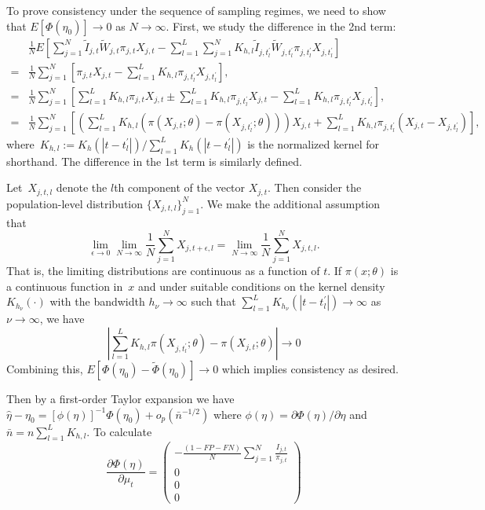 \documentclass[12pt]{amsart}
\numberwithin{equation}{section}
\theoremstyle{plain}
\begin{document}
To prove consistency under the sequence of sampling regimes, we need to show that $E[ \Phi (\eta_0) ] \to 0$ as $N \to \infty$.  First, we study the difference in the 2nd term:
\begin{align*}
&\frac{1}{N}  E \left[ \sum_{j = 1}^N \tilde I_{j,t} \tilde W_{j,t}  \pi_{j,t} X_{j,t} - \sum_{l=1}^L  \sum_{j = 1}^N K_{h,l} \tilde I_{j,t^\prime_l} \tilde W_{j,t^\prime_l}  \pi_{j,t^\prime_l} X_{j,t^\prime_l} \right] \\
= &\frac{1}{N} \sum_{j = 1}^N \left[ \pi_{j,t} X_{j,t} - \sum_{l=1}^L K_{h,l} \pi_{j,t^\prime_l} X_{j,t^\prime_l} \right], \\
= &\frac{1}{N} \sum_{j = 1}^N \left[ \sum_{l=1}^L K_{h,l} \pi_{j,t} X_{j,t} \pm \sum_{l=1}^L K_{h,l} \pi_{j,t_l^\prime} X_{j,t}  - \sum_{l=1}^L K_{h, l} \pi_{j,t^\prime_l} X_{j,t^\prime_l} \right], \\
= &\frac{1}{N} \sum_{j = 1}^N \left[ \left( \sum_{l=1}^L K_{h,l}  \left( \pi (X_{j,t}; \theta) - \pi (X_{j,t^\prime_l}; \theta) \right) \right) X_{j,t} + \sum_{l=1}^L K_{h,l} \pi_{j,t^\prime_l} (X_{j,t} - X_{j,t^\prime_l} ) \right],
\end{align*}
where~$K_{h,l} := K_h(|t - t_l^\prime|) / \sum_{l=1}^L K_{h} \left(|t - t_l^\prime| \right)$ is the normalized kernel for shorthand. The difference in the 1st term is similarly defined.

Let~$X_{j,t,l}$ denote the $l$th component of the vector $X_{j,t}$.  Then consider the population-level distribution $\{ X_{j,t,l} \}_{j=1}^N$.  We make the additional assumption that
$$
\lim_{\epsilon \to 0} \lim_{N \to \infty} \frac{1}{N} \sum_{j=1}^N X_{j,t+\epsilon, l}  = \lim_{N \to \infty} \frac{1}{N} \sum_{j=1}^N X_{j,t, l}.
$$
That is, the limiting distributions are continuous as a function of $t$. If $\pi(x; \theta)$ is a continuous function in~$x$ and under suitable conditions on the kernel density~$K_{h_\nu} (\cdot)$ with the bandwidth $h_\nu \to \infty$ such that $\sum_{l=1}^L K_{h_{\nu}} \left( | t - t_l^\prime | \right) \to \infty$ as $\nu \to \infty$, we have
$$
\left | \sum_{l=1}^L K_{h, l} \pi (X_{j, t_l^\prime}; \theta) - \pi (X_{j, t}; \theta) \right|  \to 0
$$
Combining this, $E \left[ \Phi(\eta_0)  - \tilde \Phi (\eta_0) \right] \to 0$ which implies consistency as desired.

Then by a first-order Taylor expansion we have $\hat \eta - \eta_0 = \left[ \phi (\eta) \right]^{-1} \Phi(\eta_0) + o_p (\bar n^{-1/2})$ where $\phi(\eta) = \partial \Phi (\eta)/\partial \eta$ and $\bar n = n \sum_{l=1}^L K_{h,l}$.  To calculate
$$
\frac{\partial \Phi (\eta)}{\partial \mu_t} =
\left (
\begin{array}{c}
-\frac{(1-FP-FN)}{N} \sum_{j=1}^N \frac{I_{j,t}}{\pi_{j,t}} \\
0 \\
0 \\
0
\end{array}
\right )
$$
\end{document}
